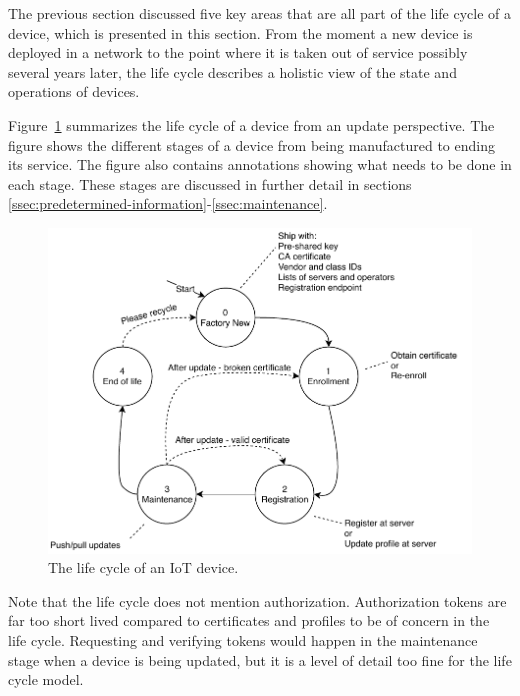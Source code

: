 \documentclass[0-thesis.tex]{subfiles}
\begin{document}
The previous section discussed five key areas that are all part of the life cycle of a
device, which is presented in this section. From the moment a new device is deployed in a
network to the point where it is taken out of service possibly several years later, the
life cycle describes a holistic view of the state and operations of devices.

Figure~\ref{fig:lifecycle} summarizes the life cycle of a device from an update
perspective. The figure shows the different stages of a device from being manufactured to
ending its service. The figure also contains annotations showing what needs to be done in
each stage. These stages are discussed in further detail in sections
\ref{ssec:predetermined-information}-\ref{ssec:maintenance}. 

\begin{figure}[t]
    \caption{The life cycle of an IoT device.}
    \label{fig:lifecycle}
    \includegraphics{images/lifecycle.pdf}
\end{figure}

Note that the life cycle does not mention authorization. Authorization tokens are far too
short lived compared to certificates and profiles to be of concern in the life cycle.
Requesting and verifying tokens would happen in the maintenance stage when a device is
being updated, but it is a level of detail too fine for the life cycle model.
\end{document}
